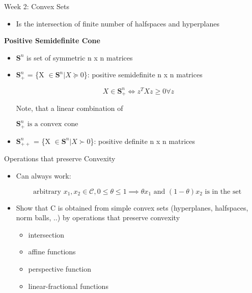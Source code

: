 \documentclass{article}
\begin{document}
\begin{homeworkProblemName}{{\LARGE Week 2: Convex Sets}}
\begin{problemAnswer}
{\begin{itemize}
        Ax $\prec$ b, Cx = d

        \[\text{Where } A \in \bm{R}^{m x n}, C \in \bm{R}^{p x n}, \text{ and } \prec
         \text{ is componentwise inequality}\]

      \item Is the intersection of finite number of halfspaces and hyperplanes
      \end{itemize}
    }\end{problemAnswer}


  \vspace{0.2 cm} \textbf{\large Positive Semidefinite Cone}

  \begin{problemAnswer}{
      \begin{itemize}
      \item $\bm{S}^n$ is set of symmetric n x n matrices
      \item $\bm{S}^n_+$ = \{X $\in \bm{S}^n | X \succeq 0$\}: positive semidefinite n x
        n matrices

        \[X \in \bm{S}^n_+ \iff z^TXz \geq 0 \forall z\]

        Note, that a linear combination of

        $\bm{S}^n_+ \text{ is a convex cone} $

      \item $\bm{S}^n_{++}$ = \{X $\in \bm{S}^n | X \succ 0$\}: positive definite n x
        n matrices
      \end{itemize}
    }\end{problemAnswer}

  \clearpage

  {\Large Operations that preserve Convexity}


  \begin{problemAnswer}{
      \begin{itemize}
      \item Can always work:

        \[\text{arbitrary } x_1,  x_2 \in \mathcal{C}, 0 \leq \theta \leq  1 \implies \theta x_1 \text{ and } (1 - \theta)x_2 \text{ is in the set }\]

      \item Show that C is obtained from simple convex sets (hyperplanes,
        halfspaces, norm balls, ..) by operations that preserve convexity
        \begin{itemize}
        \item intersection
        \item affine functions
        \item perspective function
        \item linear-fractional functions
        \end{itemize}
      \end{itemize}
    }\end{problemAnswer}


\end{homeworkProblemName}
\end{document}
